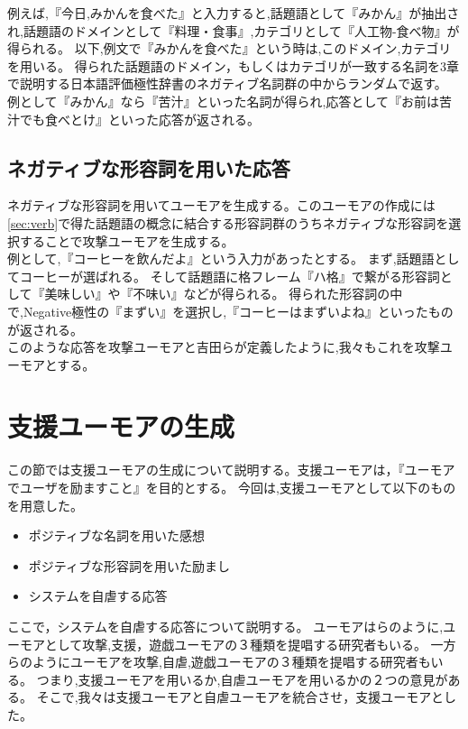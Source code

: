 例えば,『今日,みかんを食べた』と入力すると,話題語として『みかん』が抽出され,話題語のドメインとして『料理・食事』,カテゴリとして『人工物-食べ物』が得られる。
以下,例文で『みかんを食べた』という時は,このドメイン,カテゴリを用いる。
得られた話題語のドメイン，もしくはカテゴリが一致する名詞を3章で説明する日本語評価極性辞書のネガティブ名詞群の中からランダムで返す。\\
\hspace{1zw}例として『みかん』なら『苦汁』といった名詞が得られ,応答として『お前は苦汁でも食べとけ』といった応答が返される。




\subsection{ネガティブな形容詞を用いた応答}\label{sec:ata2}
ネガティブな形容詞を用いてユーモアを生成する。このユーモアの作成には
\ref{sec:verb}で得た話題語の概念に結合する形容詞群のうちネガティブな形容詞を選択することで攻撃ユーモアを生成する。\\
\hspace{1zw}例として,『コーヒーを飲んだよ』という入力があったとする。
まず,話題語としてコーヒーが選ばれる。
そして話題語に格フレーム『ハ格』で繋がる形容詞として『美味しい』や『不味い』などが得られる。
得られた形容詞の中で,Negative極性の『まずい』を選択し,『コーヒーはまずいよね』といったものが返される。\\
\hspace{1zw}このような応答を攻撃ユーモアと吉田ら\cite{humor_yoshida}が定義したように,我々もこれを攻撃ユーモアとする。







\section{支援ユーモアの生成}\label{sec:maso}
この節では支援ユーモアの生成について説明する。支援ユーモアは，『ユーモアでユーザを励ますこと』を目的とする。
今回は,支援ユーモアとして以下のものを用意した。

\begin{itemize}
\item ポジティブな名詞を用いた感想
\item ポジティブな形容詞を用いた励まし
\item システムを自虐する応答
\end{itemize}

ここで，システムを自虐する応答について説明する。
ユーモアは\cite{UENO,Tani,牧野}らのように,ユーモアとして攻撃,支援，遊戯ユーモアの３種類を提唱する研究者もいる。
一方\cite{塚脇}らのようにユーモアを攻撃,自虐,遊戯ユーモアの３種類を提唱する研究者もいる。
つまり,支援ユーモアを用いるか,自虐ユーモアを用いるかの２つの意見がある。
そこで,我々は支援ユーモアと自虐ユーモアを統合させ，支援ユーモアとした。


